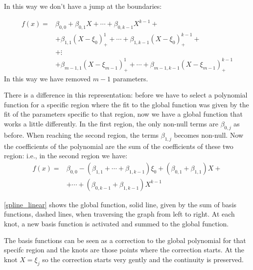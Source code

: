 \documentclass[12pt, letterpaper]{article}
\theoremstyle{definition}
\begin{document}
 In this way we don't have a jump at the boundaries:

\begin{equation}
\begin{aligned}
f(x) =& \beta_{0,0} + \beta_{0,1}X +\cdots+\beta_{0,k-1}  X^{k-1} + \\
&+ \beta_{1,1}(X -\xi_0)_+^1       +\cdots +\beta_{1,k-1} (X -\xi_0)_+^{k-1}+  \\
&+\vdots \\ 
&+ \beta_{m-1,1}(X -\xi_{m-1})_+^1 +\cdots +\beta_{m-1,k-1} (X -\xi_{m-1})_+^{k-1}
\end{aligned}
\end{equation}
In this way we have removed $m-1$ parameters.

There is a difference in this representation: before we have to select a polynomial function for a specific region where the fit to the global function was given by the fit of the parameters specific to that region, now we have a global function that works a little differently. In the first region, the only non-null terms are $\beta_{0,j}$ as before. When reaching the second region, the terms $\beta_{1,j}$ becomes non-null. Now the coefficients of the polynomial are the sum of the coefficients of these two region: i.e., in the second region we have:
\begin{equation}
\begin{aligned}
f(x) =& \beta_{0,0} -(\beta_{1,1}+\cdots+\beta_{1,k-1})\xi_0+ (\beta_{0,1}+\beta_{1,1})X+\\
&+\cdots+(\beta_{0,k-1}  +\beta_{1,k-1})X^{k-1}
\end{aligned}
\end{equation}

\autoref{spline_linear} shows the global function, solid line, given by the sum of basis functions, dashed lines, when traversing the graph from left to right. At each knot, a new basis function is activated and summed to the global function.

The basis functions can be seen as a correction to the global polynomial for that  specifc region and the knots are those points where the correction starts. At the knot $X=\xi_j$ so the correction starts very gently and the continuity is preserved.
\end{document}
